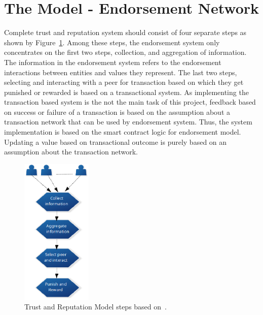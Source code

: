 \section{The Model - Endorsement Network}\label{sec:endorsementModel}
Complete trust and reputation system should consist of four separate steps as
shown by Figure~\ref{fig:truststep}. Among these steps, the endorsement system
only concentrates on the first two steps, collection, and aggregation of
information. The information in the endorsement system refers to the
endorsement interactions between entities and values they represent. The last
two steps, selecting and interacting with a peer for transaction based on which
they get punished or rewarded is based on a transactional system. As
implementing the transaction based system is the not the main task of this
project, feedback based on success or failure of a transaction is based on the
assumption about a transaction network that can be used by endorsement system.
Thus, the system implementation is based on the smart contract logic for
endorsement model. Updating a value based on transactional outcome is purely
based on an assumption about the transaction network. \par
\begin{figure}
	\begin{center}
		\includegraphics[width=0.3\textwidth]{Images/TrustReputationSteps.eps}
		\caption{Trust and Reputation Model steps based
		on~\cite{marmol2009security}.}
		\label{fig:truststep}
	\end{center}
\end{figure}
